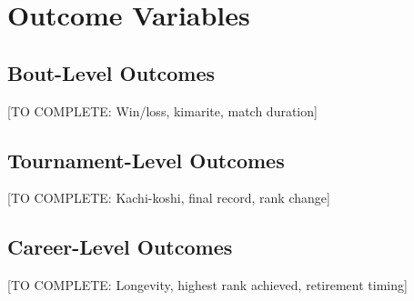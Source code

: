 \section{Outcome Variables}

\subsection{Bout-Level Outcomes}

[TO COMPLETE: Win/loss, kimarite, match duration]

\subsection{Tournament-Level Outcomes}

[TO COMPLETE: Kachi-koshi, final record, rank change]

\subsection{Career-Level Outcomes}

[TO COMPLETE: Longevity, highest rank achieved, retirement timing]